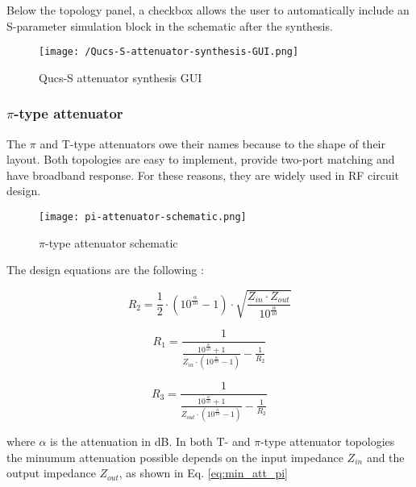 \noindent Below the topology panel, a checkbox allows the user to automatically include an S-parameter simulation block in the schematic after the synthesis.

\begin{figure}[ht]
    \centering
    \texttt{[image: /Qucs-S-attenuator-synthesis-GUI.png]}
    \caption{Qucs-S attenuator synthesis GUI}
    \label{fig:qucs-s-attenuator-synthesis-GUI}
\end{figure}

\subsubsection{$\pi$-type attenuator}

\noindent The $\pi$ and T-type attenuators owe their names because to the shape of their layout. Both topologies are easy to implement, provide two-port matching and have broadband response. For these reasons, they are widely used in RF circuit design.

\begin{figure}[ht]
    \centering
    \texttt{[image: pi-attenuator-schematic.png]}
    \caption{$\pi$-type attenuator schematic}
    \label{fig:pi-type-attenuator-schematic}
\end{figure}

\noindent The design equations are the following \cite{vizmuller1995rf}:

\begin{equation}
    R_2 = \frac{1}{2} \cdot (10^{\frac{\alpha}{10}} - 1) \cdot \sqrt{\frac{Z_{in} \cdot Z_{out}}{10^{\frac{\alpha}{10}}}}
\end{equation}

\begin{equation}
    R_1 = \frac{1} {\frac{10^{\frac{\alpha}{10}}+1}{Z_{in} \cdot (10^{\frac{\alpha}{10}} - 1)} - \frac{1}{R_2}}
\end{equation}

\begin{equation}
    R_3 = \frac{1} {\frac{10^{\frac{\alpha}{10}}+1}{Z_{out} \cdot (10^{\frac{\alpha}{10}} - 1)} - \frac{1}{R_2}}
\end{equation}


\noindent where $\alpha$ is the attenuation in dB. In both T- and $\pi$-type attenuator topologies the minumum attenuation possible depends on the input impedance $Z_{in}$ and the output impedance $Z_{out}$, as shown in Eq. \ref{eq:min_att_pi}

